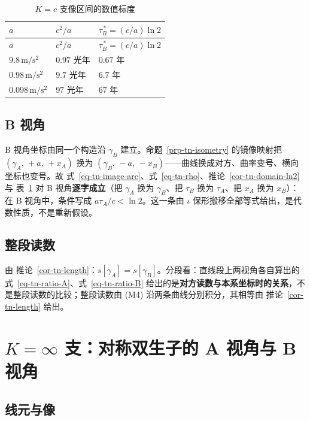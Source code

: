 \documentclass[
  chinese,
  a4paper,
  UTF8,
  12pt,
  oneside,
  openany]{ctexbook}
\theoremstyle{plain}
\theoremstyle{plain}
\theoremstyle{plain}
\theoremstyle{definition}
\theoremstyle{plain}
\theoremstyle{plain}
\theoremstyle{remark}
\begin{document}
\begin{longtable}[]{@{}lll@{}}
\caption{\(K=c\) 支像区间的数值标度}\label{tbl-tn-scale}\tabularnewline
\toprule\noalign{}
\(a\) & \(c^{2}/a\) & \(\tau_B^{\,*}=(c/a)\ln2\) \\
\midrule\noalign{}
\endfirsthead
\toprule\noalign{}
\(a\) & \(c^{2}/a\) & \(\tau_B^{\,*}=(c/a)\ln2\) \\
\midrule\noalign{}
\endhead
\bottomrule\noalign{}
\endlastfoot
\(9.8\,\mathrm{m/s^{2}}\) & \(0.97\) 光年 & \(0.67\) 年 \\
\(0.98\,\mathrm{m/s^{2}}\) & \(9.7\) 光年 & \(6.7\) 年 \\
\(0.098\,\mathrm{m/s^{2}}\) & \(97\) 光年 & \(67\) 年 \\
\end{longtable}

\subsection{B 视角}\label{b-ux89c6ux89d2}

B 视角坐标由同一个构造沿 \(\gamma_B\) 建立。命题~\ref{prp-tn-isometry}
的镜像映射把 \((\gamma_A,\,+a,\,+x_A)\) 换为
\((\gamma_B,\,-a,\,-x_B)\)------曲线换成对方、曲率变号、横向坐标也变号。故
式~\ref{eq-tn-image-arc}、式~\ref{eq-tn-rho}、推论~\ref{cor-tn-domain-ln2}
与 表~\ref{tbl-tn-scale} 对 B 视角\textbf{逐字成立}（把 \(\gamma_A\)
换为 \(\gamma_B\)、把 \(\tau_B\) 换为 \(\tau_A\)、把 \(x_A\) 换为
\(x_B\)）：在 B 视角中，条件写成 \(a\tau_A/c<\ln2\)。这一条由 \(\iota\)
保形搬移全部等式给出，是代数性质，不是重新假设。

\subsection{整段读数}\label{ux6574ux6bb5ux8bfbux6570}

由
推论~\ref{cor-tn-length}：\(s[\gamma_A]=s[\gamma_B]\)。分段看：直线段上两视角各自算出的
式~\ref{eq-tn-ratio-A}、式~\ref{eq-tn-ratio-B}
给出的是\textbf{对方读数与本系坐标时的关系}，不是整段读数的比较；整段读数由
(M4) 沿两条曲线分别积分，其相等由 推论~\ref{cor-tn-length} 给出。

\section{\texorpdfstring{\(K=\infty\) 支：对称双生子的 A 视角与 B
视角}{K=\textbackslash infty 支：对称双生子的 A 视角与 B 视角}}\label{sec-tn-galilean}

\subsection{线元与像}\label{ux7ebfux5143ux4e0eux50cf}
\end{document}
